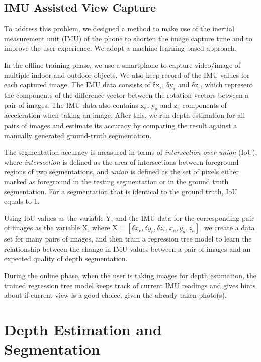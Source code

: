 \subsection{IMU Assisted View Capture}

To address this problem, we designed a method to make use of the inertial measurement unit (IMU) of the phone to shorten the image capture time and to improve the user experience. We adopt a machine-learning based approach.

In the offline training phase, we use a smartphone to capture video/image of multiple indoor and outdoor objects. We also keep record of the IMU values for each captured image. The IMU data consists of $\mathrm{\delta x_r}$, $\mathrm{\delta y_r}$ and $\mathrm{\delta z_r}$, which represent the components of the difference vector between the rotation vectors between a pair of images. The IMU data also contains $\mathrm{x_a}$, $\mathrm{y_a}$ and $\mathrm{z_a}$ components of acceleration when taking an image. After this, we run depth estimation for all pairs of images and estimate its accuracy by comparing the result against a manually generated ground-truth segmentation.

The segmentation accuracy is measured in terms of \textit{intersection over union} (IoU), where \textit{intersection} is defined as the area of intersections between foreground regions of two segmentations, and \textit{union} is defined as the set of pixels either marked as foreground in the testing segmentation or in the ground truth segmentation. For a segmentation that is identical to the ground truth, IoU equals to 1.

Using IoU values as the variable $\mathrm{Y}$, and the IMU data for the corresponding pair of images as the variable $\mathrm{X}$, where \(\mathrm{X} = [\delta x_r, \delta y_r, \allowbreak \delta z_r,\allowbreak x_a,\allowbreak y_a, z_a]\), we create a data set for many pairs of images, and then train a regression tree model to learn the relationship between the change in IMU values between a pair of images and an expected quality of depth segmentation.

During the online phase, when the user is taking images for depth estimation, the trained regression tree model keeps track of current IMU readings and gives hints about if current view is a good choice, given the already taken photo(s).

\section{Depth Estimation and Segmentation}
\label{sec:dest}

